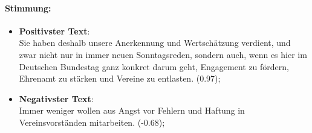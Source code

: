 \documentclass{article}
\begin{document}
\paragraph{Stimmung:}

\begin{itemize}
\item {\textbf{Positivster Text}: \\ 

Sie haben deshalb unsere Anerkennung und Wertschätzung verdient, und zwar nicht nur in immer neuen Sonntagsreden, sondern auch, wenn es hier im Deutschen Bundestag ganz konkret darum geht, Engagement zu fördern, Ehrenamt zu stärken und Vereine zu entlasten.   (0.97)};
\item {\textbf{Negativster Text}: \\ 

Immer weniger wollen aus Angst vor Fehlern und Haftung in Vereinsvorständen mitarbeiten. (-0.68)};
\end{itemize}

\clearpage
\end{document}

